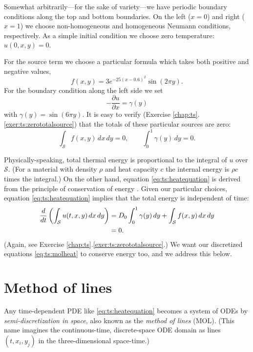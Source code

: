 Somewhat arbitrarily---for the sake of variety---we have periodic boundary conditions along the top and bottom boundaries.  On the left ($x=0$) and right ($x=1$) we choose non-homogeneous and homogeneous Neumann conditions, respectively.  As a simple initial condition we choose zero temperature: $u(0,x,y)=0$.

For the source term we choose a particular formula which takes both positive and negative values,
    $$f(x,y) = 3 e^{-25(x-0.6)^2} \sin(2 \pi y).$$
For the boundary condition along the left side we set
\begin{equation}
-\frac{\partial u}{\partial x} = \gamma(y) \label{eq:ts:leftneumannbc}
\end{equation}
with $\gamma(y) = \sin(6\pi y)$.  It is easy to verify (Exercise \ref{chap:ts}.\ref{exer:ts:zerototalsource}) that the totals of these particular sources are zero:
\begin{equation}
\int_{\mathcal{S}} f(x,y)\,dx\,dy = 0, \qquad \int_0^1 \gamma(y)\,dy = 0. \label{eq:ts:zerototalsource}
\end{equation}

Physically-speaking, total thermal energy is proportional to the integral of $u$ over $\mathcal{S}$.  (For a material with density $\rho$ and heat capacity $c$ the internal energy is $\rho c$ times the integral.)  On the other hand, equation \eqref{eq:ts:heatequation} is derived from the principle of conservation of energy \citep{Ockendonetal2003}.  Given our particular choices, equation \eqref{eq:ts:heatequation} implies that the total energy is independent of time:
\begin{align}
\frac{d}{dt} \left(\int_{\mathcal{S}} u(t,x,y)\,dx\,dy\right) &= D_0 \int_0^1 \gamma(y)\,dy + \int_{\mathcal{S}} f(x,y)\,dx\,dy \label{eq:ts:conservedscalar} \\
   &= 0. \notag
\end{align}
(Again, see Exercise \ref{chap:ts}.\ref{exer:ts:zerototalsource}.)  We want our discretized equations \eqref{eq:ts:molheat} to conserve energy too, and we address this below.


\section{Method of lines}  Any time-dependent PDE like \eqref{eq:ts:heatequation} becomes a system of ODEs by \emph{semi-discretization in space}, also known as the \emph{method of lines} (MOL).  (This name imagines the continuous-time, discrete-space ODE domain as lines $(t,x_i,y_j)$ in the three-dimensional space-time.)

